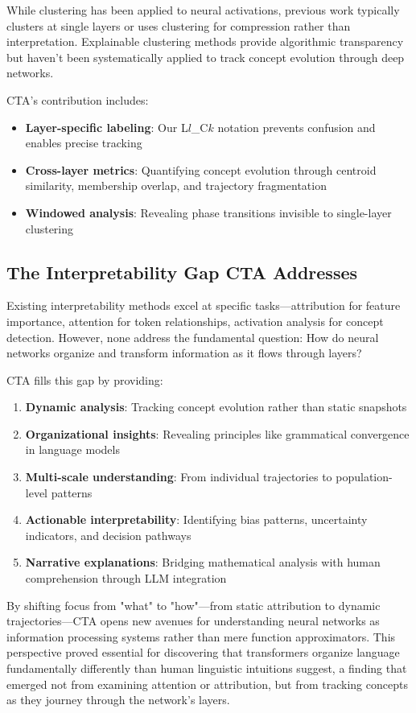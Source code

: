 While clustering has been applied to neural activations, previous work typically clusters at single layers or uses clustering for compression rather than interpretation. Explainable clustering methods \citep{dasgupta2020} provide algorithmic transparency but haven't been systematically applied to track concept evolution through deep networks.

CTA's contribution includes:
\begin{itemize}
    \item \textbf{Layer-specific labeling}: Our L$l$\_C$k$ notation prevents confusion and enables precise tracking
    \item \textbf{Cross-layer metrics}: Quantifying concept evolution through centroid similarity, membership overlap, and trajectory fragmentation
    \item \textbf{Windowed analysis}: Revealing phase transitions invisible to single-layer clustering
\end{itemize}

\subsection{The Interpretability Gap CTA Addresses}

Existing interpretability methods excel at specific tasks—attribution for feature importance, attention for token relationships, activation analysis for concept detection. However, none address the fundamental question: How do neural networks organize and transform information as it flows through layers?

CTA fills this gap by providing:
\begin{enumerate}
    \item \textbf{Dynamic analysis}: Tracking concept evolution rather than static snapshots
    \item \textbf{Organizational insights}: Revealing principles like grammatical convergence in language models
    \item \textbf{Multi-scale understanding}: From individual trajectories to population-level patterns
    \item \textbf{Actionable interpretability}: Identifying bias patterns, uncertainty indicators, and decision pathways
    \item \textbf{Narrative explanations}: Bridging mathematical analysis with human comprehension through LLM integration
\end{enumerate}

By shifting focus from "what" to "how"—from static attribution to dynamic trajectories—CTA opens new avenues for understanding neural networks as information processing systems rather than mere function approximators. This perspective proved essential for discovering that transformers organize language fundamentally differently than human linguistic intuitions suggest, a finding that emerged not from examining attention or attribution, but from tracking concepts as they journey through the network's layers.